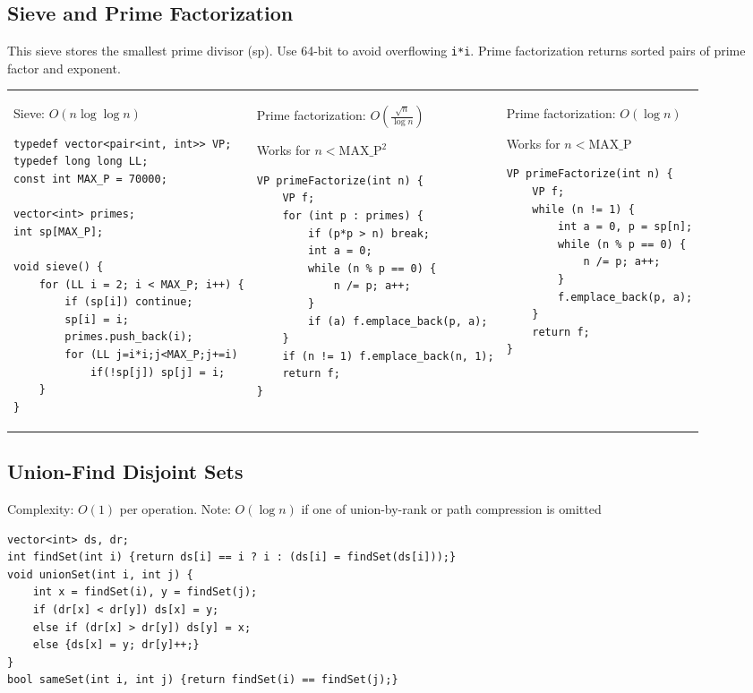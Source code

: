 \documentclass[letterpaper]{article}
\begin{document}
\clearpage
\subsection{Sieve and Prime Factorization}

This sieve stores the smallest prime divisor (sp). Use 64-bit to avoid overflowing \texttt{i*i}. Prime factorization returns sorted pairs of prime factor and exponent.

\begin{tabular}{@{}p{6cm}p{6cm}p{6cm}@{}}

Sieve: $O\left(n\log\log n\right)$

\begin{lstlisting}
typedef vector<pair<int, int>> VP;
typedef long long LL;
const int MAX_P = 70000;

vector<int> primes;
int sp[MAX_P];

void sieve() {
	for (LL i = 2; i < MAX_P; i++) {
		if (sp[i]) continue;
		sp[i] = i;
		primes.push_back(i);
		for (LL j=i*i;j<MAX_P;j+=i)
			if(!sp[j]) sp[j] = i;
	}
}
\end{lstlisting}
&
Prime factorization: $O\left(\frac{\sqrt n}{\log n}\right)$

Works for $n<\mathrm{MAX\_P}^2$
\begin{lstlisting}
VP primeFactorize(int n) {
	VP f;
	for (int p : primes) {
		if (p*p > n) break;
		int a = 0;
		while (n % p == 0) {
			n /= p; a++;
		}
		if (a) f.emplace_back(p, a);
	}
	if (n != 1) f.emplace_back(n, 1);
	return f;
}
\end{lstlisting}
&
Prime factorization: $O\left(\log n\right)$

Works for $n<\mathrm{MAX\_P}$
\begin{lstlisting}
VP primeFactorize(int n) {
	VP f;
	while (n != 1) {
		int a = 0, p = sp[n];
		while (n % p == 0) {
			n /= p; a++;
		}
		f.emplace_back(p, a);
	}
	return f;
}
\end{lstlisting}
\end{tabular}

\subsection{Union-Find Disjoint Sets}

Complexity: $O\left(1\right)$ per operation. Note: $O\left(\log n\right)$ if one of union-by-rank or path compression is omitted

\begin{lstlisting}
vector<int> ds, dr;
int findSet(int i) {return ds[i] == i ? i : (ds[i] = findSet(ds[i]));}
void unionSet(int i, int j) {
	int x = findSet(i), y = findSet(j);
	if (dr[x] < dr[y]) ds[x] = y;
	else if (dr[x] > dr[y]) ds[y] = x;
	else {ds[x] = y; dr[y]++;}
}
bool sameSet(int i, int j) {return findSet(i) == findSet(j);}
\end{lstlisting}
\end{document}
